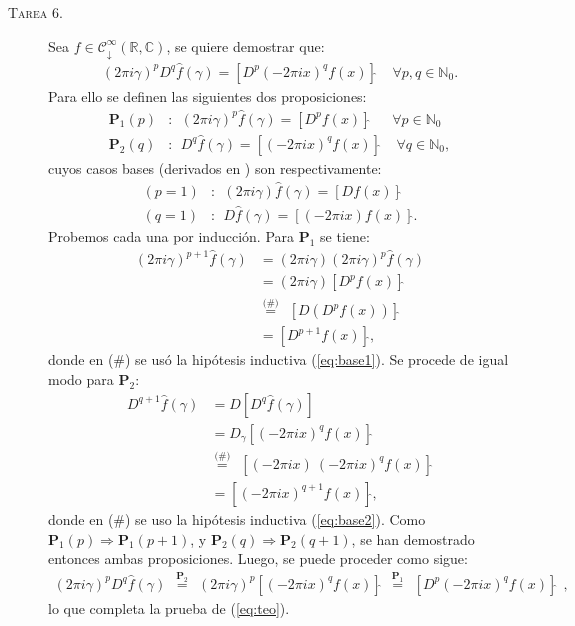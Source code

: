 \documentclass[spanish, fleqn]{article}
\begin{document}
\begin{description}
    \item[\textsc{Tarea 6.}] Sea $f \in \mathcal{C}_{\downarrow}^\infty(\mathbb{R},\mathbb{C})$, se quiere demostrar que:
    \begin{align}
        (2 \pi i \gamma)^p D^q \widehat{f}(\gamma) = \left[D^p (-2 \pi i x)^q f(x)\right]\widehat{} \ \ \ \ \ \forall p,q \in \mathbb{N}_0.
    \label{eq:teo}
    \end{align}
    Para ello se definen las siguientes dos proposiciones:
    \begin{align*}
        \mathbf{P}_1(p) &: \ \ (2 \pi i \gamma)^p \widehat{f}(\gamma) = \left[D^p f(x) \right]\widehat{} \ \ \ \ \ \ \ \forall p \in \mathbb{N}_0 \\
        \mathbf{P}_2(q) &: \ \ D^q \widehat{f}(\gamma) = [(-2 \pi i x)^q f(x)]\widehat{} \ \ \ \ \ \forall q \in \mathbb{N}_0,
    \end{align*}
    cuyos casos bases (derivados en \cite{DymMcKean}) son respectivamente:
    \begin{align}
        (p=1) &: \ \ (2 \pi i \gamma) \widehat{f}(\gamma) = \left[ D f(x) \right]\widehat{} \label{eq:base1} \\
        (q=1) &: \ \ D \widehat{f}(\gamma) =  \left[ (-2 \pi i x) f(x) \right]\widehat{} \label{eq:base2}.
    \end{align}
    Probemos cada una por inducción. Para $\mathbf{P}_1$ se tiene:
    \begin{align*}
        (2 \pi i \gamma)^{p+1} \widehat{f}(\gamma) &= (2 \pi i \gamma)(2 \pi i \gamma)^{p} \widehat{f}(\gamma) \\
        &= (2 \pi i \gamma) \left[ D^p f(x) \right]\widehat{} \\
        &\stackrel{\text{(\#)}}{=} \ \ \left[ D(D^p f(x)) \right]\widehat{} \\
        & = \left[ D^{p+1} f(x) \right]\widehat{},
    \end{align*}
    donde en (\#) se usó la hipótesis inductiva (\ref{eq:base1}). Se procede de igual modo para $\mathbf{P}_2$:
    \begin{align*}
        D^{q+1} \widehat{f}(\gamma) &= D\left[D^{q} \widehat{f}(\gamma)\right] \\
        &= D_{\gamma} \left[(-2 \pi i x)^q f(x) \right]\widehat{} \\
        &\stackrel{\text{(\#)}}{=} \ \ \left[(-2 \pi i x)\ (-2 \pi i x)^q f(x) \right]\widehat{} \\
        &= \left[(-2 \pi i x)^{q+1} f(x) \right]\widehat{},
    \end{align*}
    donde en (\#) se uso la hipótesis inductiva (\ref{eq:base2}). Como $\mathbf{P}_1(p)\Rightarrow \mathbf{P}_1(p+1)$,
    y $\mathbf{P}_2(q) \Rightarrow \mathbf{P}_2(q+1)$, se han demostrado entonces ambas proposiciones. Luego, se puede proceder como sigue:
    \begin{align*}
        (2 \pi i \gamma)^p D^q \widehat{f}(\gamma) \ \ \stackrel{\mathbf{P}_2}{=} \ \ (2 \pi i \gamma)^p \left[ (-2 \pi i x)^q f(x) \right]\widehat{} \ \ \stackrel{\mathbf{P}_1}{=} \ \ \left[ D^p (-2 \pi i x)^q f(x) \right]\widehat{}\ \ ,
    \end{align*}
    lo que completa la prueba de (\ref{eq:teo}).


\end{description}
\end{document}
